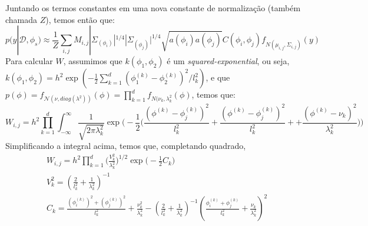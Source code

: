 \documentclass[12pt]{article}
\begin{document}
 Juntando os termos constantes em uma nova constante de normalização (também chamada $Z$), temos então que:
 \begin{equation}
  p(y | \mathcal{D},\phi_s) \approx \frac{1}{Z} \sum_{i,j}  M_{i,j} |\Sigma_{(\phi_i)}|^{1/4} |\Sigma_{(\phi_j)}|^{1/4} 
  \sqrt{a(\phi_i) a(\phi_j)} C(\phi_i,\phi_j) f_{N(\mu_{i,j}, \Sigma_{i,j})}(y)
 \end{equation}
 Para calcular $W$, assumimos que $k(\phi_1,\phi_2)$ é um \textit{squared-exponential}, ou seja, 
 $k(\phi_1,\phi_2) = h^2 \exp(-\frac{1}{2} \sum_{k=1}^d (\phi_1^{(k)} - \phi_2^{(k)})^2/l_k^2)$, 
 e que $p(\phi) = f_{\mathcal{N}(\nu,{diag}(\lambda^2))}(\phi) = 
 \prod_{k=1}^d f_{N(\nu_k,\lambda_k^2}(\phi)$, temos que:
 \begin{equation}
  W_{i,j} = h^2 \prod_{k=1}^{d} \int_{-\infty}^{\infty}
	  \frac{1}{\sqrt{2 \pi \lambda_k^2}}\exp \Big(-\frac{1}{2} \Big( 
		  \frac{(\phi^{(k)} - \phi_j^{(k)})^2}{l_k^2} + \frac{(\phi^{(k)} - \phi_j^{(k)})^2}{l_k^2} 
		    + + \frac{(\phi^{(k)} - \nu_k)^2}{\lambda_k^2} \Big) \Big)
 \end{equation}
 Simplificando a integral acima, temos que, completando quadrado,
 \begin{equation}
 \begin{split}
  & W_{i,j} = h^2 \prod_{k=1}^{d} \Big( \frac{V_k^2}{\lambda_k^2} \Big)^{1/2} \exp \Big(-\frac{1}{2} C_k \Big) \\
  & V_k^2 = \left( \frac{2}{l_k^2} + \frac{1}{\lambda_k^2} \right)^{-1} \\
  & C_k = \frac{(\phi_i^{(k)})^2 + (\phi_j^{(k)})^2}{l_k^2} + \frac{\nu_k^2}{\lambda_k^2} 
    - \left(\frac{2}{l_k^2} + \frac{1}{\lambda_k^2} \right)^{-1} 
    \left(\frac{\phi_i^{(k)} + \phi_j^{(k)}}{l_k^2} + \frac{\nu_k}{\lambda_k^{2}} \right)^2
 \end{split}
 \end{equation}
\end{document}
